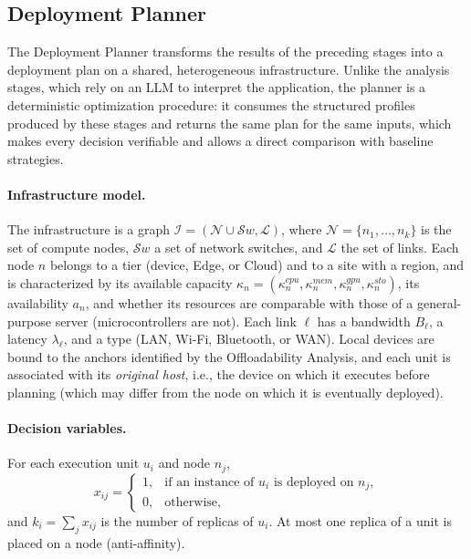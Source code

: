\subsection{Deployment Planner}

The Deployment Planner transforms the results of the preceding stages into a
deployment plan on a shared, heterogeneous infrastructure. Unlike the
analysis stages, which rely on an LLM to interpret the application, the
planner is a deterministic optimization procedure: it consumes the structured
profiles produced by these stages and returns the same plan for the same
inputs, which makes every decision verifiable and allows a direct comparison
with baseline strategies.

\paragraph{Infrastructure model.}
The infrastructure is a graph $\mathcal{I}=(\mathcal{N}\cup\mathcal{S}w,\mathcal{L})$,
where $\mathcal{N}=\{n_1,\ldots,n_k\}$ is the set of compute nodes,
$\mathcal{S}w$ a set of network switches, and $\mathcal{L}$ the set of links.
Each node $n$ belongs to a tier (device, Edge, or Cloud) and to a site with a
region, and is characterized by its available capacity
$\kappa_n=(\kappa_n^{cpu},\kappa_n^{mem},\kappa_n^{gpu},\kappa_n^{sto})$, its
availability $a_n$, and whether its resources are comparable with those of a
general-purpose server (microcontrollers are not). Each link $\ell$ has a
bandwidth $B_\ell$, a latency $\lambda_\ell$, and a type (LAN, Wi-Fi,
Bluetooth, or WAN). Local devices are bound to the anchors identified by the
Offloadability Analysis, and each unit is associated with its \emph{original
host}, i.e., the device on which it executes before planning (which may differ
from the node on which it is eventually deployed).

\paragraph{Decision variables.}
For each execution unit $u_i$ and node $n_j$,
\begin{equation}
x_{ij} =
\begin{cases}
1, & \text{if an instance of } u_i \text{ is deployed on } n_j,\\
0, & \text{otherwise},
\end{cases}
\end{equation}
and $k_i=\sum_j x_{ij}$ is the number of replicas of $u_i$. At most one replica
of a unit is placed on a node (anti-affinity).

